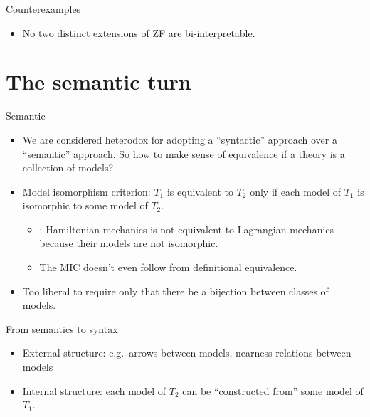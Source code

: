 \documentclass[fleqn]{beamer}
\begin{document}
\begin{frame}{Counterexamples}

  \begin{itemize}
  \item No two distinct extensions of ZF are
    bi-interpretable. \citep{enayat}
  \end{itemize}

\end{frame}

\section{The semantic turn}


\begin{frame}{Semantic}

  \begin{itemize}
  \item We are considered heterodox for adopting a ``syntactic''
    approach over a ``semantic'' approach. So how to make sense of
    equivalence if a theory is a collection of models?
  \item Model isomorphism criterion: $T_1$ is equivalent to $T_2$ only
    if each model of $T_1$ is isomorphic to some model of $T_2$.
    \begin{itemize}
    \item \citet{north}: Hamiltonian mechanics is not equivalent to
      Lagrangian mechanics because their models are not isomorphic.
    \item The MIC doesn't even follow from definitional equivalence.
    \end{itemize}
  \item Too liberal to require only that there be a bijection between
    classes of models.
  \end{itemize}

\end{frame}


\begin{frame}{From semantics to syntax}

  \begin{itemize}
  \item External structure: e.g.\ arrows between models, nearness
    relations between models
  \item Internal structure: each model of $T_2$ can be ``constructed
    from'' some model of $T_1$.
  \end{itemize}


\end{frame}
\end{document}
